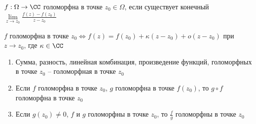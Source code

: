 
\begin{definition}\thmslashn
	
	$f:\Omega \to \CC$ голоморфна в точке $z_0 \in \Omega$, если существует конечный $\lim\limits_{z\to z_0} \frac{f(z) - f(z_0)}{z-z_0}$
	
\end{definition}

\begin{remark}\thmslashn
	
	$f$ голоморфна в точке $z_0 \Leftrightarrow f(z) = f(z_0) + \kappa(z - z_0) + o(z - z_0)$ при $z \to z_0$, где $\kappa \in \CC$
	
\end{remark}

\begin{properties}\thmslashn
	
	\begin{enumerate}
		\item
		Сумма, разность, линейная комбинация, произведение функций, голоморфных в точке $z_0$ -- голоморфная в точке $z_0$
		
		\item
		Если $f$ голоморфна в точке $z_0$, $g$ голоморфна в точке $f(z_0)$, то $g\circ f$ голоморфна в точке $z_0$
		
		\item
		Если $g(z_0) \not = 0$, $f$ и $g$ голоморфны в точке $z_0$, то $\frac{f}{g}$ голоморфны в точке $z_0$
	\end{enumerate}
	
\end{properties}

